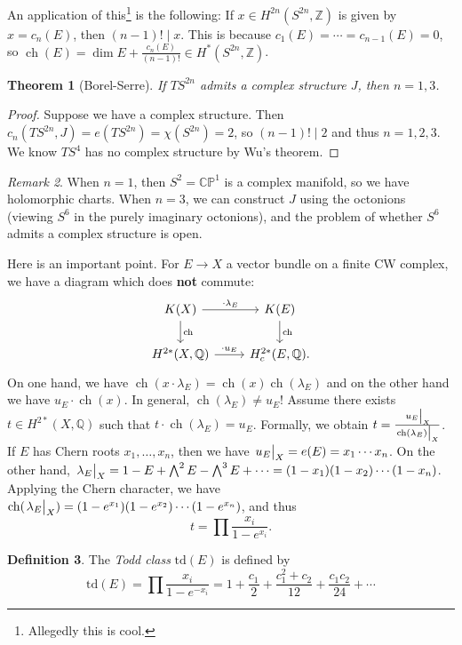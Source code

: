 \documentclass[leqno, openany]{memoir}
\newtheorem{thm}{Theorem}[section]
\theoremstyle{definition}
\newtheorem{defn}[thm]{Definition}
\theoremstyle{remark}
\newtheorem{rmk}[thm]{Remark}
\theoremstyle{plain}
\theoremstyle{definition}
\theoremstyle{remark}
\newcommand{\C}{\mathbb{C}}
\newcommand{\Z}{\mathbb{Z}}
\newcommand{\Q}{\mathbb{Q}}
\renewcommand{\P}{\mathbb{P}}
\newcommand{\mr}[1]{\mathrm{#1}}
\DeclareMathOperator{\ch}{ch}
\begin{document}
An application of this\footnote{Allegedly this is cool.} is the following: If
$x \in H^{2n}(S^{2n}, \Z)$ is given by $x = c_n(E)$, then $(n-1)! \mid x$. This
is because $c_1(E) = \cdots = c_{n-1}(E) = 0$, so $\ch(E) = \dim E +
\frac{c_n(E)}{(n-1)!} \in H^*(S^{2n}, \Z)$.

\begin{thm}[Borel-Serre] If $TS^{2n}$ admits a complex structure $J$, then $n =
1, 3$.  \end{thm}

\begin{proof} Suppose we have a complex structure. Then $c_n(TS^{2n}, J) =
e(TS^{2n}) = \chi(S^{2n}) = 2$, so $(n-1)! \mid 2$ and thus $n = 1,2,3$. We
know $TS^4$ has no complex structure by Wu's theorem.  \end{proof}

\begin{rmk} When $n =1$, then $S^2 = \C\P^1$ is a complex manifold, so we have
    holomorphic charts. When $n=3$, we can construct $J$ using the octonions
    (viewing $S^6$ in the purely imaginary octonions), and the problem of
    whether $S^6$ admits a complex structure is open.  \end{rmk}

Here is an important point. For $E \to X$ a vector bundle on a finite CW
complex, we have a diagram which does \textbf{not} commute: \begin{equation*}
    \begin{tikzcd} K(X) \ar{r}{\cdot \lambda_E} \ar{d}{\ch} & K(E) \ar{d}{\ch}
        \\ H^{2*}(X, \Q) \ar{r}{\cdot u_E} & H_c^{2*}(E, \Q).  \end{tikzcd}
    \end{equation*} On one hand, we have $\ch(x \cdot \lambda_E) = \ch(x)
    \ch(\lambda_E)$ and on the other hand we have $u_E \cdot \ch(x)$. In
    general, $\ch(\lambda_E) \neq u_E$! Assume there exists $t \in H^{2*}(X,
    \Q)$ such that $t \cdot \ch(\lambda_E) = u_E$. Formally, we obtain $t =
    \frac{\eval{u_E}_X}{\eval{\ch(\lambda_E)}_X}$. If $E$ has Chern roots $x_1,
    \ldots, x_n$, then we have $\eval{u_E}_X = e(E) = x_1 \cdots x_n$. On the
    other hand, $\eval{\lambda_E}_X = 1 - E + \bigwedge^2 E - \bigwedge^3 E +
    \cdots = (1-x_1)(1-x_2) \cdots (1-x_n)$. Applying the Chern character, we
    have $\ch(\eval{\lambda_E}_X) = (1-e^{x_1})(1-e^{x_2}) \cdots (1-e^{x_n})$,
    and thus \[ t = \prod \frac{x_i}{1-e^{x_i}}. \]

\begin{defn} The \textit{Todd class} $\mr{td}(E)$ is defined by \[ \mr{td}(E) =
\prod \frac{x_i}{1-e^{-x_i}} = 1 + \frac{c_1}{2} + \frac{c_1^2 + c_2}{12} +
\frac{c_1c_2}{24} + \cdots \] \end{defn}
\end{document}
